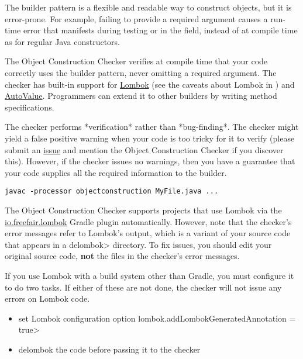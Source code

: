 \htmlhr
{}

The builder pattern is a flexible and readable way to construct objects, but it is error-prone.
For example, failing to provide a required argument causes a run-time error that manifests during testing
or in the field, instead of at compile time as for regular Java constructors.

The Object Construction Checker verifies at compile time that your code correctly uses the builder pattern,
never omitting a required argument. The checker has built-in support for \href{https://projectlombok.org/}{Lombok}
(see the caveats about Lombok in ) and
\href{https://github.com/google/auto/blob/master/value/userguide/index.md}{AutoValue}.
Programmers can extend it to other builders by writing method specifications.

The checker performs *verification* rather than *bug-finding*.  The checker
might yield a false positive warning when your code is too tricky for it to
verify (please submit an
\href{https://github.com/typetools/checker-framework/issues}{issue} and mention the Object Construction Checker if
you discover this).  However, if the checker issues no warnings, then you
have a guarantee that your code supplies all the required information to
the builder.


\begin{Verbatim}
javac -processor objectconstruction MyFile.java ...
\end{Verbatim}


The Object Construction Checker supports projects that use Lombok via
the \href{https://plugins.gradle.org/plugin/io.freefair.lombok}{io.freefair.lombok} Gradle plugin automatically.
However, note that the checker's error messages refer to Lombok's output, which is a variant of your source code
that appears in a \<delombok> directory.
To fix issues, you should edit your original source code, \textbf{not} the files in the checker's error messages.

If you use Lombok with a build system other than Gradle, you must configure it to do two tasks.
If either of these are not done, the checker will not issue any errors on Lombok code.
\begin{itemize}
\item set Lombok configuration option \<lombok.addLombokGeneratedAnnotation = true>
\item delombok the code before passing it to the checker
\end{itemize}

